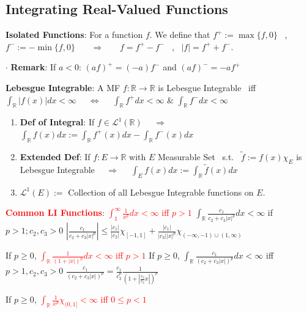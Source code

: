 \documentclass[9pt]{article}
\begin{document}
\subsection{Integrating Real-Valued Functions}

\textbf{Isolated Functions}: For a function $f$. We define that $f^+:=\max\{f,0\}$ \ , \ $f^-:=-\min\{f,0\}$ \ \ \ $\Rightarrow$ \ \ \ $f=f^+-f^-$ \ , \ $|f|=f^++f^-$.

$\cdot$ \textbf{Remark}: If $a<0$: $(af)^+=(-a)f^-$ and $(af)^-=-af^+$

\textbf{Lebesgue Integrable}: A MF $f:\mathbb{R}\to\mathbb{R}$ is Lebesgue Integrable \ iff \ $\int_{\mathbb{R}}|f(x)|dx<\infty$ \ \ $\Leftrightarrow$ \ \ $\int_{\mathbb{R}}f^+dx<\infty$ \& $\int_{\mathbb{R}}f^-dx<\infty$
\begin{enumerate}[itemsep=-2pt, topsep=-2pt]
    \item \textbf{Def of Integral}: If $f\in\mathcal{L}^1(\mathbb{R})$ \ \ $\Rightarrow$ \ \ $\int_{\mathbb{R}}f(x)dx:=\int_{\mathbb{R}}f^+(x)dx-\int_{\mathbb{R}}f^-(x)dx$
    \item \textbf{Extended Def}: If $f:E\to\mathbb{R}$ with $E$ Measurable Set \ s.t. \ $\tilde{f}:=f(x)\chi_E$ is Lebesgue Integrable \ \ $\Rightarrow$ \ \ $\int_Ef(x)dx:=\int_{\mathbb{R}}\tilde{f}(x)dx$
    \item $\mathcal{L}^1(E):=$ Collection of all Lebesgue Integrable functions on $E$.
\end{enumerate}

\textcolor{red}{\textbf{Common LI Functions}}: {\small \textcolor{red}{$\int_{1}^{\infty}\frac{1}{x^p}dx<\infty$ iff $p>1$} \qquad $\int_{\mathbb{R}}\frac{c_1}{c_2+c_3|x|^p}dx<\infty$ if $p>1;c_2,c_3>0$} {\tiny $|\frac{c_1}{c_2+c_3|x|^p}|\le\frac{|c_1|}{|c_2|}\chi_{[-1,1]}+\frac{|c_1|}{|c_3||x|^p}\chi_{(-\infty,-1)\cup(1,\infty)}$}

{\small If $p\geq0$, \textcolor{red}{$\int_{\mathbb{R}}\frac{1}{(1+|x|)^p}dx<\infty$ iff $p>1$} \qquad If $p\geq0$, $\int_{\mathbb{R}}\frac{c_1}{(c_2+c_3|x|)^p}dx<\infty$ iff $p>1,c_2,c_3>0$} {\tiny $\frac{c_1}{(c_2+c_3|x|)^p}=\frac{c_1}{c_2^p}\frac{1}{(1+|\frac{c_3}{c_2}x|)^p}$}

{\small If $p\geq0$, \textcolor{red}{$\int_{\mathbb{R}}\frac{1}{x^p}\chi_{(0,1]}<\infty$ iff $0\leq p<1$}}
\end{document}
